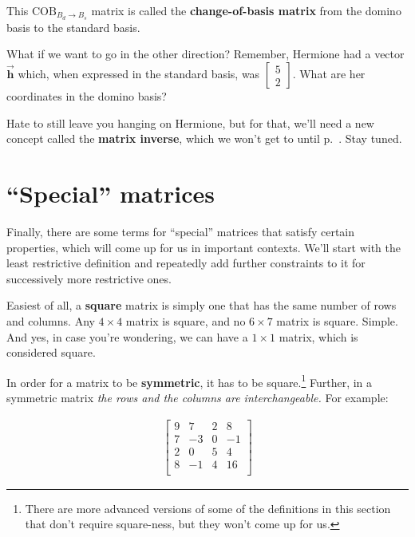 This $\textrm{COB}_{B_d \rightarrow B_s}$ matrix is called the
\textbf{change-of-basis matrix} from the domino basis to the standard basis.

\bigskip
{}
\label{changeOfBasisOtherWayCliffhanger}

What if we want to go in the other direction? Remember, Hermione had a vector
$\overrightarrow{\textbf{h}}$ which, when expressed in the standard basis, was
{\scriptsize $\begin{bmatrix} 5 \\ 2 \end{bmatrix}$}. What are her coordinates
in the domino basis?

\smallskip

Hate to still leave you hanging on Hermione, but for that, we'll need a new
concept called the \textbf{matrix inverse}, which we won't get to until
p.~\pageref{matrixInverse}. Stay tuned.


\section{``Special'' matrices}

Finally, there are some terms for ``special'' matrices that satisfy certain
properties, which will come up for us in important contexts. We'll start with
the least restrictive definition and repeatedly add further constraints to it
for successively more restrictive ones.

Easiest of all, a \textbf{square} matrix is simply one that has the same number
of rows and columns. Any $4\times 4$ matrix is square, and no $6\times 7$
matrix is square. Simple. And yes, in case you're wondering, we can have a
$1\times 1$ matrix, which is considered square.


In order for a matrix to be \textbf{symmetric}, it has to be
square.\footnote{There are more advanced versions of some of the definitions in
this section that don't require square-ness, but they won't come up for us.}
Further, in a symmetric matrix \textit{the rows and the columns are
interchangeable.} For example:

\vspace{-.15in}
\begin{align*}
\begin{bmatrix}
9 & 7 & 2 & 8\\
7 & -3 & 0 & -1\\
2 & 0 & 5 & 4 \\
8 & -1 & 4 & 16 \\
\end{bmatrix}
\end{align*}
\vspace{-.15in}

